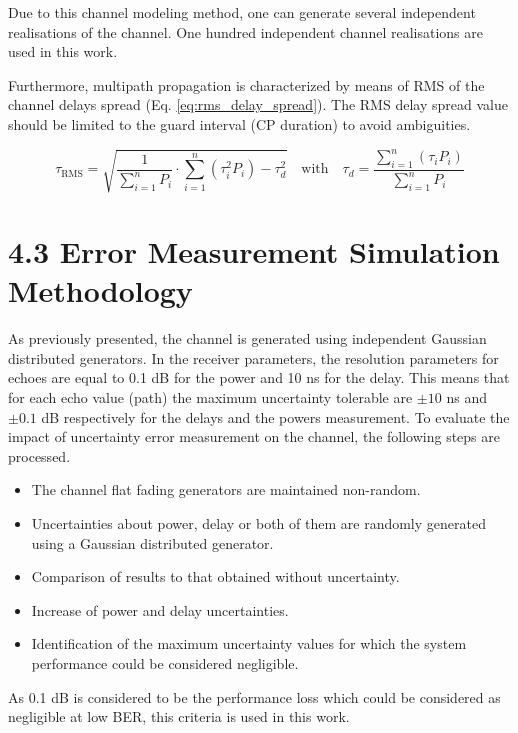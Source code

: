 \documentclass[10pt]{article}
\begin{document}
 

Due to this channel modeling method, one can generate several independent realisations of the channel. One hundred independent channel realisations are used in this work.

Furthermore, multipath propagation is characterized by means of RMS of the channel delays spread (Eq. \ref{eq:rms_delay_spread}). The RMS delay spread value should be limited to the guard interval (CP duration) to avoid ambiguities.

\begin{equation}
\tau_{\text{RMS}} = \sqrt{\frac{1}{\sum_{i=1}^{n}P_i} \cdot \sum_{i=1}^{n}( \tau_i^2 P_i) - \tau_d^2}
\quad \text{with} \quad \tau_d = \frac{\sum_{i=1}^{n} (\tau_i P_i)}{\sum_{i=1}^{n}P_i}
\label{eq:rms_delay_spread}
\end{equation}

\section*{4.3 Error Measurement Simulation Methodology}

As previously presented, the channel is generated using independent Gaussian distributed generators. In the receiver parameters, the resolution parameters for echoes are equal to 0.1 dB for the power and 10 ns for the delay. This means that for each echo value (path) the maximum uncertainty tolerable are $\pm10$ ns and $\pm0.1$ dB respectively for the delays and the powers measurement. To evaluate the impact of uncertainty error measurement on the channel, the following steps are processed.

\begin{itemize}[label=-]
    \item The channel flat fading generators are maintained non-random.
    \item Uncertainties about power, delay or both of them are randomly generated using a Gaussian distributed generator.
    \item Comparison of results to that obtained without uncertainty.
    \item Increase of power and delay uncertainties.
    \item Identification of the maximum uncertainty values for which the system performance could be considered negligible.
\end{itemize}

As 0.1 dB is considered to be the performance loss which could be considered as negligible at low BER, this criteria is used in this work.
\end{document}
